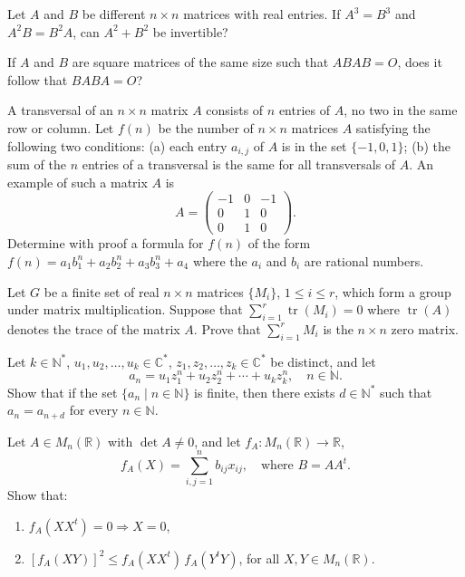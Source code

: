 \documentclass[12pt]{article}
\begin{document}
\begin{problems}
\item Let $A$ and $B$ be different $n\times n$ matrices with real entries. If $A^3=B^3$ and $A^2B=B^2A$, can $A^2+B^2$ be invertible?

\item If $A$ and $B$ are square matrices of the same size such that $ABAB=O$, does it follow that $BABA=O$?

\item A transversal of an $n\times n$ matrix $A$ consists of $n$ entries of $A$, no two in the same row or column. Let $f(n)$ be the number of $n\times n$ matrices $A$ satisfying the following two conditions: (a) each entry $a_{i,j}$ of $A$ is in the set $\{-1,0,1\}$; (b) the sum of the $n$ entries of a transversal is the same for all transversals of $A$. An example of such a matrix $A$ is
\[
A = \begin{pmatrix}-1 & 0 & -1\\ 0 & 1 & 0\\ 0 & 1 & 0\end{pmatrix}.
\]
Determine with proof a formula for $f(n)$ of the form $f(n) = a_1b_1^n + a_2b_2^n + a_3b_3^n + a_4$ where the $a_i$ and $b_i$ are rational numbers.

\item Let $G$ be a finite set of real $n\times n$ matrices $\{M_i\}$, $1\le i\le r$, which form a group under matrix multiplication. Suppose that $\sum_{i=1}^r \operatorname{tr}(M_i) = 0$ where $\operatorname{tr}(A)$ denotes the trace of the matrix $A$. Prove that $\sum_{i=1}^r M_i$ is the $n\times n$ zero matrix.

\item Let $k \in \mathbb{N}^*$, $u_1, u_2, \ldots, u_k \in \mathbb{C}^*$, $z_1, z_2, \ldots, z_k \in \mathbb{C}^*$ be distinct, and let
$$a_n = u_1 z_1^n + u_2 z_2^n + \cdots + u_k z_k^n, \quad n \in \mathbb{N}.$$
Show that if the set $\{a_n \mid n \in \mathbb{N}\}$ is finite, then there exists $d \in \mathbb{N}^*$ such that $a_n = a_{n+d}$ for every $n \in \mathbb{N}$.

\item Let $A \in M_n(\mathbb{R})$ with $\det A \neq 0$, and let $f_A : M_n(\mathbb{R}) \to \mathbb{R}$,
$$f_A(X) = \sum_{i,j=1}^{n} b_{ij} x_{ij}, \quad \text{where } B = AA^t.$$
Show that:
\begin{enumerate}[label=(\alph*)]
\item $f_A(XX^t) = 0 \Rightarrow X = 0$,
\item $[f_A(XY)]^2 \le f_A(XX^t)\, f_A(Y^tY)$, for all $X, Y \in M_n(\mathbb{R})$.
\end{enumerate}


\end{problems}
\end{document}
